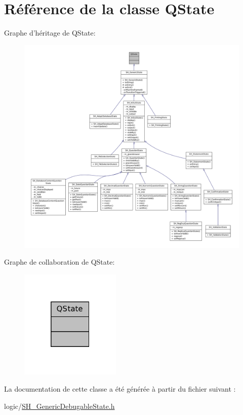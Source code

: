\hypertarget{classQState}{\section{Référence de la classe Q\-State}
\label{classQState}
}


Graphe d'héritage de Q\-State\-:
\nopagebreak
\begin{figure}[H]
\begin{center}
\leavevmode
\includegraphics[width=350pt]{classQState__inherit__graph}
\end{center}
\end{figure}


Graphe de collaboration de Q\-State\-:
\nopagebreak
\begin{figure}[H]
\begin{center}
\leavevmode
\includegraphics[width=136pt]{classQState__coll__graph}
\end{center}
\end{figure}


La documentation de cette classe a été générée à partir du fichier suivant \-:\begin{DoxyCompactItemize}
\item 
logic/\hyperlink{SH__GenericDebugableState_8h}{S\-H\-\_\-\-Generic\-Debugable\-State.\-h}\end{DoxyCompactItemize}
